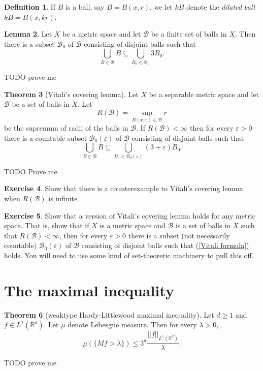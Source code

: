 \documentclass[12pt]{book}
\newcommand{\RR}{\mathbb{R}}
\newcommand{\dfn}[1]{\emph{#1}\index{#1}}
\theoremstyle{definition}
\newtheorem{theorem}{Theorem}[section]
\newtheorem{lemma}[theorem]{Lemma}
\newtheorem{definition}[theorem]{Definition}
\newtheorem{exercise}[theorem]{Exercise}
\begin{document}
\begin{definition}
If $B$ is a ball, say $B = B(x, r)$, we let $kB$ denote the \dfn{dilated ball} $kB = B(x, kr)$.
\end{definition}
\begin{lemma}
Let $X$ be a metric space and let $\mathcal B$ be a finite set of balls in $X$. Then there is a subset $\mathcal B_0$ of $\mathcal B$ consisting of disjoint balls such that
$$\bigcup_{B \in \mathcal B} B \subseteq \bigcup_{B_0 \in \mathcal B_0} 3B_0.$$
\end{lemma}
TODO prove me
\begin{theorem}[Vitali's covering lemma]
Let $X$ be a separable metric space and let $\mathcal B$ be a set of balls in $X$. Let
$$R(\mathcal B) = \sup_{B(x, r) \in \mathcal B} r$$
be the supremum of radii of the balls in $\mathcal B$. If $R(\mathcal B) < \infty$ then for every $\varepsilon > 0$ there is a countable subset $\mathcal B_0(\varepsilon)$ of $\mathcal B$ consisting of disjoint balls such that
\begin{equation}
\label{Vitali formula}
\bigcup_{B \in \mathcal B} B \subseteq \bigcup_{B_0 \in \mathcal B_0(\varepsilon)} (3 + \varepsilon)B_0.
\end{equation}
\end{theorem}
TODO Prove me

\begin{exercise}
Show that there is a counterexample to Vitali's covering lemma when $R(\mathcal B)$ is infinite.
\end{exercise}

\begin{exercise}
Show that a version of Vitali's covering lemma holds for any metric space.
That is, show that if $X$ is a metric space and $\mathcal B$ is a set of balls in $X$ such that $R(\mathcal B) < \infty$, then for every $\varepsilon > 0$ there is a subset (not necessarily countable) $\mathcal B_0(\varepsilon)$ of $\mathcal B$ consisting of disjoint balls such that (\ref{Vitali formula}) holds.
You will need to use some kind of set-theoretic machinery to pull this off.
\end{exercise}

\section{The maximal inequality}

\begin{theorem}[weaktype Hardy-Littlewood maximal inequality]
Let $d \geq 1$ and $f \in L^1(\RR^d)$. Let $\mu$ denote Lebesgue measure. Then for every $\lambda > 0$,
$$\mu(\{Mf > \lambda\}) \leq 3^d \frac{||f||_{L^1(\RR^d)}}{\lambda}.$$
\end{theorem}
TODO prove me
\end{document}
